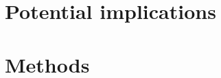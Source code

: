 \documentclass[a4paper,num-refs]{oup-contemporary}
\begin{document}
\section{Potential implications}



\section{Methods}

\end{document}
